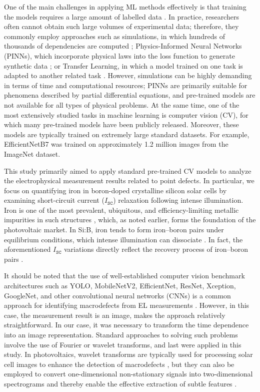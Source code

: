 \documentclass[10pt]{iopart}
\begin{document}
One of the main challenges in applying ML methods effectively is that training the models requires a large amount of labelled data \cite{Buratti2024}.
In practice, researchers often cannot obtain such large volumes of experimental data;
therefore, they commonly employ approaches such as simulations,
in which hundreds of thousands of dependencies are computed \cite{Wang2024a, Buratti2022, Buratti2020a, Olikh2025MSEB, Olikh2025SE};
Physics-Informed Neural Networks (PINNs), which incorporate physical laws into the loss function to generate synthetic data \cite{Wang2024b, Li2025};
or Transfer Learning, in which a model trained on one task is adapted to another related task \cite{Kaya2019, Kim2023}.
However, simulations can be highly demanding in terms of time and computational resources; PINNs are primarily suitable for phenomena described by partial differential equations, and pre-trained models are not available for all types of physical problems.
At the same time, one of the most extensively studied tasks in machine learning is computer vision (CV),
for which many pre-trained models have been publicly released.
Moreover, these models are typically trained on extremely large standard datasets.
For example, EfficientNetB7 was trained on approximately 1.2 million images from the ImageNet dataset.

This study primarily aimed to apply standard pre-trained CV models to analyze the electrophysical measurement results related to point defects.
In particular, we focus on quantifying iron in boron-doped crystalline silicon solar cells by examining short-circuit current
($I_\mathtt{SC}$) relaxation following intense illumination.
Iron is one of the most prevalent, ubiquitous, and efficiency-limiting metallic impurities in such structures \cite{Buonassisi2006, IronSC},
which, as noted earlier, forms the foundation of the photovoltaic market.
In Si:B, iron tends to form iron–boron pairs under equilibrium conditions, which intense illumination can dissociate \cite{Kimerling1983, FeBAssJAP2014}.
In fact, the aforementioned $I_\mathtt{SC}$ variations directly reflect the recovery process of iron–boron pairs \cite{Olikh2021JAP}.


It should be noted that the use of well-established computer vision benchmark architectures such
as YOLO, MobileNetV2, EfficientNet, ResNet, Xception, GoogleNet, and other convolutional neural networks (CNNs) is a common approach for identifying macrodefects from EL
measurements \cite{Liu2024a, Li2024a, Jia2024, Otamendi2021, Chen2022, AlOtum2024, Abdelsattar2025, tella2025}.
However, in this case, the measurement result is an image, makes the approach relatively straightforward.
In our case, it was necessary to transform the time dependence into an image representation.
Standard approaches to solving such problems involve the use of Fourier or wavelet transforms, and last were applied in this study.
In photovoltaics, wavelet transforms are typically used for processing solar cell images to enhance the detection of
macrodefects \cite{Li2012, Rosa2024}, but they can also be employed to convert one-dimensional non-stationary signals into two-dimensional spectrograms and thereby enable the effective extraction of subtle features \cite{Vinit2020}.
\end{document}
